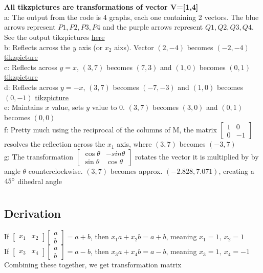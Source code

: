 \documentclass{article}
\begin{document}
\section{}
\textbf{All tikzpictures are transformations of vector V=[1,4]}
\\a: The output from the code is 4 graphs, each one containing 2 vectors. The blue arrows represent $P1, P2, P3, P4$ and the purple arrows represent $Q1,Q2,Q3,Q4$. See the output tikzpictures \color{blue}\hyperref[sec:intro]{here}\color{black}
\\[0.05in]b: Reflects across the $y$ axis (or $x_2$ aixs). Vector $(2,-4)$ becomes $(-2,-4)$ \color{blue}\hyperref[sec:b]{tikzpicture}\color{black}
\\[0.05in]c: Reflects across $y=x$, $(3,7)$ becomes $(7,3)$ and $(1,0)$ becomes $(0,1)$ \color{blue}\hyperref[sec:c]{tikzpicture}\color{black}
\\[0.05in]d: Reflects across $y=-   x$, $(3,7)$ becomes $(-7,-3)$ and $(1,0)$ becomes $(0,-1)$ \color{blue} \hyperref[sec:d]{tikzpicture}\color{black}
\\[0.05in]e: Maintains $x$ value, sets $y$ value to $0$. $(3,7)$ becomes $(3,0)$ and $(0,1)$ becomes $(0,0)$ \color{black}
\\[0.05in]f: Pretty much using the reciprocal of the columns of M, the matrix $\begin{bmatrix}1&0\\0&-1\end{bmatrix}$ resolves the reflection across the $x_1$ axis, where $(3,7)$ becomes $(-3,7)$
\\[0.05in]g: The transformation $\begin{bmatrix}\cos\theta&-sin\theta\\\sin\theta&\cos\theta\end{bmatrix}$ rotates the vector it is multiplied by by angle $\theta$ counterclockwise. $(3,7)$ becomes approx. $(-2.828, 7.071)$, creating a $45\degree$ dihedral angle
\pagebreak
\section{}
\subsection{Derivation}
If $\begin{bmatrix}x_1&x_2\end{bmatrix}\begin{bmatrix}a\\b\end{bmatrix} = a+b$, then $x_1a+x_2b=a+b$, meaning $x_1=1,~x_2=1$
\\[0.05in]If $\begin{bmatrix}x_3&x_4\end{bmatrix}\begin{bmatrix}a\\b\end{bmatrix} = a-b$, then $x_3a+x_4b=a-b$, meaning $x_3=1,~x_4=-1$
\\Combining these together, we get transformation matrix 
\end{document}
